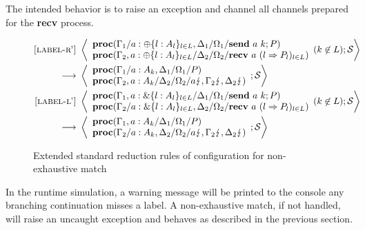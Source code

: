 \documentclass[12pt, openany]{memoir}
\newcommand*{\send}[2]{\textbf{send}\ #1\ #2}
\newcommand*{\recv}[2]{\textbf{recv}\ #1\ #2}
\newcommand*{\cancel}[1]{#1 \lightning}
\newcommand*{\procObj}[4]{\textbf{proc}(#1/#2/#3/#4)}
\newcommand*{\cancelSet}[0]{\mathcal{S}}
\begin{document}
The intended behavior is to raise an exception and channel all channels prepared for the \textbf{recv} process.
\begin{figure}[H]
  \begin{alignat}{2}
    \label{label-reduction-r'} \textsc{[label-r']} & ~ 
      \Braket{
        \begin{array}{l}
          \procObj{\Gamma_1}{a : \oplus\{l : A_l\}_{l \in L}, \Delta_1}{\Omega_1}{\send{a}{k}; P} \\
          \procObj{\Gamma_2, a : \oplus\{l : A_l\}_{l \in L}}{\Delta_2}{\Omega_2}{\recv{a}{(l \Rightarrow P_l)_{l \in L}}}
        \end{array}
        (k \not\in L)
        ; \cancelSet
      } \tag*{} \\ ~ \longrightarrow & ~ 
      \Braket{
        \begin{array}{l}
          \procObj{\Gamma_1}{a : A_k, \Delta_1}{\Omega_1}{P} \\
          \procObj{\Gamma_2, a : A_k}{\Delta_2}{\Omega_2}{\cancel{a}, \cancel{\Gamma_2}, \cancel{\Delta_2}}
        \end{array}
        ; \cancelSet
    } \tag*{} \\
    \label{label-reduction-l'} \textsc{[label-l']} & ~ 
      \Braket{
        \begin{array}{l}
          \procObj{\Gamma_1, a : \&\{l : A_l\}_{l \in L}}{\Delta_1}{\Omega_1}{\send{a}{k}; P} \\
          \procObj{\Gamma_2}{a : \&\{l : A_l\}_{l \in L}, \Delta_2}{\Omega_2}{\recv{a}{(l \Rightarrow P_l)_{l \in L}}}
        \end{array}
        (k \not\in L)
        ; \cancelSet
      } \tag*{} \\ ~ \longrightarrow & ~ 
      \Braket{
        \begin{array}{l}
          \procObj{\Gamma_1, a : A_k}{\Delta_1}{\Omega_1}{P} \\
          \procObj{\Gamma_2}{a : A_k, \Delta_2}{\Omega_2}{\cancel{a}, \cancel{\Gamma_2}, \cancel{\Delta_2}}
        \end{array}
        ; \cancelSet
    } \tag*{}
  \end{alignat}
  \raggedleft
  \caption{Extended standard reduction rules of configuration for non-exhaustive match}
  \label{fig:nonexreduction}
\end{figure}
In the runtime simulation, a warning message will be printed to the console any branching continuation misses a label.
A non-exhaustive match, if not handled, will raise an uncaught exception and behaves as described in the previous section.
\end{document}
